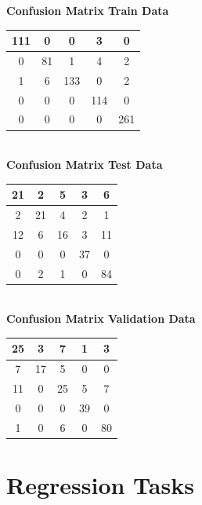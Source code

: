 \documentclass{article}
\begin{document}
\begin{flushleft}
\textbf{Confusion Matrix Train Data\\[5pt]}
\begin{tabular}{|c|c|c|c|c|}
\hline
111 & 0 & 0 & 3 & 0 \\
\hline
0 & 81 & 1 & 4 & 2 \\
\hline
1 & 6 & 133 & 0 & 2\\
\hline
0 & 0 & 0 & 114 & 0\\
\hline
0 & 0 & 0 & 0 & 261 \\
\hline
\end{tabular}
\textbf{\\[10pt] Confusion Matrix Test Data \\[5pt]}
\begin{tabular}{|c|c|c|c|c|}
\hline
21 & 2 & 5 & 3 & 6\\
\hline
2 & 21 & 4 & 2 & 1 \\
\hline
12 & 6 & 16 & 3 & 11 \\
\hline
0 & 0 & 0 & 37 & 0 \\
\hline
0 & 2 & 1 & 0 & 84 \\
\hline
\end{tabular}
\textbf{\\[10pt] Confusion Matrix Validation Data \\[5pt]}
\begin{tabular}{|c|c|c|c|c|}
\hline
25 & 3 & 7 & 1 & 3 \\
\hline
7 & 17 & 5 & 0 & 0 \\
\hline
11 & 0 & 25 & 5 & 7 \\
\hline
0 & 0 & 0 & 39 & 0 \\
\hline
1 & 0 & 6 & 0 & 80 \\
\hline
\end{tabular}
\end{flushleft}


















\section{Regression Tasks}
\end{document}
